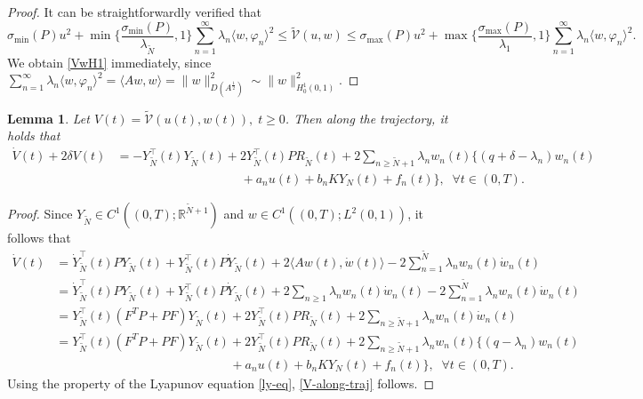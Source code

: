 \documentclass[review]{elsarticle}
\newtheorem{lemma}[theorem]{Lemma}
\numberwithin{equation}{section}
\begin{document}
\begin{proof}
   It can be straightforwardly verified that
    \begin{equation*}
        \sigma_{\min}(P)u^2+ \min\{\frac{\sigma_{\min}(P)}{\lambda_{\tilde{N}}},1\}\sum_{n=1}^\infty\lambda_n\langle w,\varphi_n\rangle^2\leq \tilde{\mathcal{V}}(u,w)\leq\sigma_{\max}(P)u^2+\max\{\frac{\sigma_{\max}(P)}{\lambda_1},1\}\sum_{n=1}^\infty\lambda_n\langle w,\varphi_n\rangle^2.
    \end{equation*}
We obtain \eqref{VwH1} immediately, since $\sum_{n=1}^\infty\lambda_n\langle w,\varphi_n\rangle^2=\langle A w, w\rangle=\|w\|^2_{D(A^{\frac{1}{2}})}\sim \|w\|^2_{H^1_0(0,1)}$.
\end{proof}
\begin{lemma}
        Let $V(t)=\tilde{\mathcal{V}}(u(t),w(t)),\;t\geq0$. Then  along the trajectory, it holds that
    \begin{equation}
        \label{V-along-traj}
        \begin{aligned}
    \dot{V}(t)+2\delta V(t)&=- Y_{\tilde{N}}^{\top}(t)Y_{\tilde{N}}(t)+2 Y_{\tilde{N}}^{\top}(t)P R_{\tilde{N}}(t)+2 \sum_{n\ge \tilde{N}+1}\lambda_{n} w_{n}(t) \{(q+\delta-\lambda_n )w_n(t)\\
&\quad\quad\quad\quad\quad\quad\quad\quad\quad\quad+a_nu(t)+b_n KY_{N}(t)+f_n(t)\},\;\;\forall t\in(0,T).
    \end{aligned}
    \end{equation}
\end{lemma}
\begin{proof}
    Since $ Y_{\tilde{N}} \in C^{1}((0, T) ; \mathbb{R}^{\tilde{N}+1}) $ and  $w \in C^{1}((0, T) ; L^{2}(0,1))$, it follows that
\begin{equation*}
\begin{aligned}
\dot{V}(t)&= \dot{Y}_{\tilde{N}}^{\top}(t) P Y_{\tilde{N}}(t)+ Y_{\tilde{N}}^{\top}(t) P \dot{Y}_{\tilde{N}}(t)+2\langle A w(t), \dot{w}(t)\rangle-2 \sum_{n=1}^{\tilde{N}} \lambda_{n} w_{n}(t) \dot{w}_{n}(t)\\[2mm]
&= \dot{Y}_{\tilde{N}}^{\top}(t) P Y_{\tilde{N}}(t)+ Y_{\tilde{N}}^{\top}(t) P \dot{Y}_{\tilde{N}}(t)+2 \sum_{n\ge 1}\lambda_{n} w_{n}(t) \dot{w}_{n}(t)-2 \sum_{n=1}^{\tilde{N}} \lambda_{n} w_{n}(t) \dot{w}_{n}(t)\\[2mm]
&= Y_{\tilde{N}}^{\top}(t)(F^T P+PF)Y_{\tilde{N}}(t)+2 Y_{\tilde{N}}^{\top}(t)P R_{\tilde{N}}(t)+2 \sum_{n\ge \tilde{N}+1}\lambda_{n} w_{n}(t) \dot{w}_{n}(t)\\[2mm]
&= Y_{\tilde{N}}^{\top}(t)(F^T P+PF)Y_{\tilde{N}}(t)+2 Y_{\tilde{N}}^{\top}(t)P R_{\tilde{N}}(t)+2 \sum_{n\ge \tilde{N}+1}\lambda_{n} w_{n}(t) \{(q-\lambda_n )w_n(t)\\
&\quad\quad\quad\quad\quad\quad\quad\quad\quad\quad\quad\quad\quad\quad+a_nu(t)+b_n KY_{N}(t)+f_n(t)\},\;\;\forall t\in(0,T).
\end{aligned}
\end{equation*}
Using the property of the Lyapunov equation \eqref{ly-eq}, \eqref{V-along-traj} follows.
\end{proof}
\end{document}
